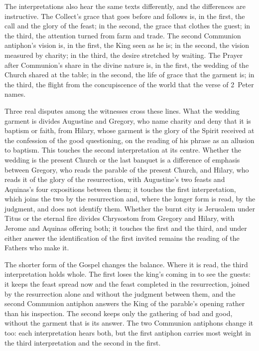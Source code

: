 The interpretations also hear the same texts differently, and the
differences are instructive. The Collect's grace that goes before and follows
is, in the first, the call and the glory of the feast; in the second, the
grace that clothes the guest; in the third, the attention turned from farm and
trade. The second Communion antiphon's vision is, in the first, the King seen
as he is; in the second, the vision measured by charity; in the third, the
desire stretched by waiting. The Prayer after Communion's share in the divine
nature is, in the first, the wedding of the Church shared at the table; in
the second, the life of grace that the garment is; in the third, the flight
from the concupiscence of the world that the verse of 2~Peter names.

Three real disputes among the witnesses cross these lines. What the wedding garment is divides Augustine and Gregory, who
name charity and deny that it is baptism or faith, from Hilary, whose garment
is the glory of the Spirit received at the confession of the good questioning,
on the reading of his phrase as an allusion to baptism. This touches the
second interpretation at its centre. Whether the wedding is the present Church
or the last banquet is a difference of emphasis between Gregory, who reads the
parable of the present Church, and Hilary, who reads it of the glory of the
resurrection, with Augustine's two feasts and Aquinas's four expositions
between them; it touches the first interpretation, which joins the two by the
resurrection and, where the longer form is read, by the judgment, and does not
identify them. Whether the burnt city is Jerusalem under
Titus or the eternal fire divides Chrysostom from Gregory and Hilary, with
Jerome and Aquinas offering both; it touches the first and the third, and
under either answer the identification of the first invited remains the
reading of the Fathers who make it.

The shorter form of the Gospel changes the balance. Where it is read, the
third interpretation holds whole. The first loses the king's coming in to see
the guests: it keeps the feast spread now and the feast completed in the
resurrection, joined by the resurrection alone and without the judgment
between them, and the second Communion antiphon answers the King of the
parable's opening rather than his inspection. The second keeps only the
gathering of bad and good, without the garment that is its answer. The two
Communion antiphons change it too: each interpretation hears both, but the
first antiphon carries most weight in the third interpretation and the second
in the first.

